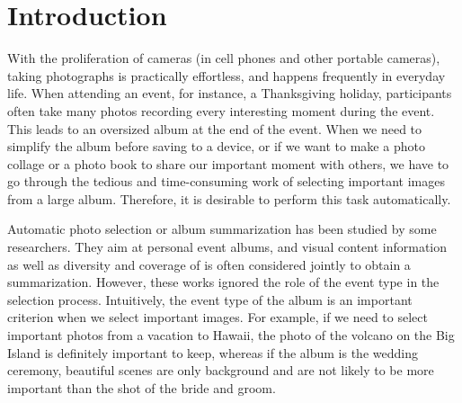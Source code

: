 \documentclass[10pt,twocolumn,letterpaper]{article}
\begin{document}
\section{Introduction}
With the proliferation of cameras (in cell phones and other portable cameras), taking photographs is practically effortless, and happens frequently in everyday life. When attending an event, for instance, a Thanksgiving holiday, participants often take many photos recording every interesting moment during the event. This leads to an oversized album at the end of the event. When we need to simplify the album before saving to a device, or if we want to make a photo collage or a photo book to share our important moment %
with others, we have to go through the tedious and time-consuming work of selecting important images from a large album. Therefore, it is desirable to perform this task automatically.





Automatic photo selection or album summarization has been studied by some researchers\cite{nips_summarize, vacation, sum_pinaki, photo_selection1, gaze}. They aim at personal event albums, and visual content information as well as diversity and coverage of is often considered jointly to obtain a summarization. 
However, these works ignored the role of the event type in the selection process. Intuitively, the event type of the album is an important criterion when we select important images. For example, if we need to select important photos from a vacation to Hawaii, the photo of the volcano on the Big Island is definitely important to keep, whereas if the album is the wedding ceremony, beautiful scenes are only background and are not likely to be more important than the shot of the bride and groom. 
\end{document}
